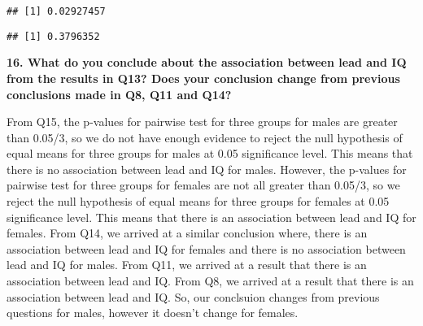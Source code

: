 \documentclass[
]{article}
\newenvironment{Shaded}{\begin{snugshade}}{\end{snugshade}}
\newcommand{\AttributeTok}[1]{\textcolor[rgb]{0.77,0.63,0.00}{#1}}
\newcommand{\DecValTok}[1]{\textcolor[rgb]{0.00,0.00,0.81}{#1}}
\newcommand{\FunctionTok}[1]{\textcolor[rgb]{0.00,0.00,0.00}{#1}}
\newcommand{\NormalTok}[1]{#1}
\newcommand{\OtherTok}[1]{\textcolor[rgb]{0.56,0.35,0.01}{#1}}
\newcommand{\SpecialCharTok}[1]{\textcolor[rgb]{0.00,0.00,0.00}{#1}}
\begin{document}
\begin{verbatim}
## [1] 0.02927457
\end{verbatim}

\begin{Shaded}
\end{Shaded}

\begin{verbatim}
## [1] 0.3796352
\end{verbatim}

\textbf{16. What do you conclude about the association between lead and
IQ from the results in Q13? Does your conclusion change from previous
conclusions made in Q8, Q11 and Q14?}

From Q15, the p-values for pairwise test for three groups for males are
greater than 0.05/3, so we do not have enough evidence to reject the
null hypothesis of equal means for three groups for males at 0.05
significance level. This means that there is no association between lead
and IQ for males. However, the p-values for pairwise test for three
groups for females are not all greater than 0.05/3, so we reject the
null hypothesis of equal means for three groups for females at 0.05
significance level. This means that there is an association between lead
and IQ for females. From Q14, we arrived at a similar conclusion where,
there is an association between lead and IQ for females and there is no
association between lead and IQ for males. From Q11, we arrived at a
result that there is an association between lead and IQ. From Q8, we
arrived at a result that there is an association between lead and IQ.
So, our conclsuion changes from previous questions for males, however it
doesn't change for females.
\end{document}
